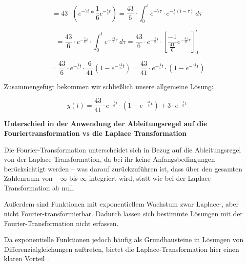 \[
= 43 \cdot \left( e^{-7t} * \frac{1}{6} e^{-\frac{1}{6}t} \right)
= \frac{43}{6} \cdot \int_0^t e^{-7\tau} \cdot e^{-\frac{1}{6}(t - \tau)} \, d\tau
\]

\[
= \frac{43}{6} \cdot e^{-\frac{1}{6}t} \cdot \int_0^t e^{-\frac{41}{6}\tau} \, d\tau
= \frac{43}{6} \cdot e^{-\frac{1}{6}t} \cdot \left[ \frac{-1}{\frac{41}{6}} e^{-\frac{41}{6}\tau} \right]_0^t
\]

\[
= \frac{43}{6} \cdot e^{-\frac{1}{6}t} \cdot \frac{6}{41} \left( 1 - e^{-\frac{41}{6}t} \right)
= \frac{43}{41} \cdot e^{-\frac{1}{6}t} \cdot \left( 1 - e^{-\frac{41}{6}t} \right)
\]

Zusammengefügt bekommen wir schließlich unsere allgemeine Lösung:

\[
 y(t) = \frac{43}{41} \cdot e^{-\frac{1}{6}t} \cdot \left( 1 - e^{-\frac{41}{6}t} \right) + 3 \cdot e^{-\frac{1}{6}t}
\]
    
\addvspace{1cm}
\textbf{Unterschied in der Anwendung der Ableitungsregel auf die Fouriertransformation vs die Laplace Transformation}

Die Fourier-Transformation unterscheidet sich in Bezug auf die Ableitungsregel von der Laplace-Transformation, da bei ihr keine Anfangsbedingungen berücksichtigt werden – was darauf zurückzuführen ist, dass über den gesamten Zahlenraum von $-\infty$ bis $\infty$ integriert wird, statt wie bei der Laplace-Transformation ab null. 

Außerdem sind Funktionen mit exponentiellem Wachstum zwar Laplace-, aber nicht Fourier-transformierbar. Dadurch lassen sich bestimmte Lösungen mit der Fourier-Transformation nicht erfassen. 

Da exponentielle Funktionen jedoch häufig als Grundbausteine in Lösungen von Differenzialgleichungen auftreten, bietet die Laplace-Transformation hier einen klaren Vorteil \cite[891]{buch1}.
